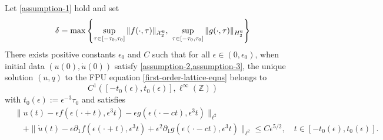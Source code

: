 \begin{theorem}
	Let \cref{assumption-1} hold and set
	\begin{equation*}
		\delta = \max \left\{\sup_{\tau\in[-\tau_0, \tau_0]}\|f(\cdot,\tau)\|_{\mathcal{X}^6_2},\ \sup_{\tau\in[-\tau_0, \tau_0]} \|g(\cdot, \tau)\|_{H^6_2} \right\}
	\end{equation*}
	There exists positive constants \(\epsilon_0\) and \(C\) such that for all \(\epsilon \in(0,\epsilon_0)\), when initial data \((u(0), \dot u(0))\) satisfy \cref{assumption-2,assumption-3}, the unique solution \((u,q)\) to the FPU equation \cref{first-order-lattice-eqns} belongs to 
	\begin{equation*}
		C^1([-t_0(\epsilon), t_0(\epsilon)], \ell^\infty(\mathbb Z))
	\end{equation*}
	with \(t_0(\epsilon):= \epsilon^{-3}\tau_0 \) and satisfies
	\begin{equation*}
		\begin{aligned}
			&\| u(t) - \epsilon f(\epsilon(\cdot+t), \epsilon^3 t) -\epsilon g(\epsilon(\cdot -ct) ,\epsilon^3 t) \|_{\ell^2} \\
			&\quad + \| \dot u(t) - \epsilon \partial_1 f(\epsilon (\cdot +t),\epsilon^3t)  +\epsilon^2 \partial_1 g(\epsilon(\cdot - ct), \epsilon^3t)\|_{\ell^2} \leq C \epsilon^{5/2 }, \quad t\in[-t_0(\epsilon), t_0(\epsilon)].
		\end{aligned}
	\end{equation*}
\end{theorem}

